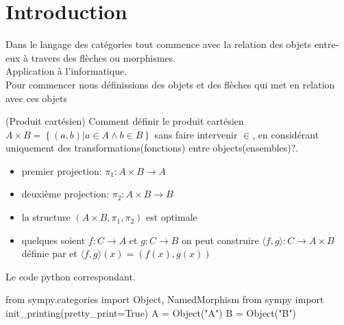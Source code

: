 \section{Introduction}
Dans le langage des catégories tout commence avec la relation des objets entre-eux à travers des flèches ou morphismes.
\\

Application à l'informatique.
\\

Pour commencer nous définissions des objets et des flèches qui met en relation avec ces objets 

\begin{example}(Produit cartésien)
Comment définir le produit cartésien $A \times B = \left\lbrace \left( a, b\right)  \vert a \in A \wedge b \in B\right\rbrace$ sans faire intervenir $\in$, en considérant uniquement des transformations(fonctions) entre objects(ensembles)?.
\begin{itemize}
 \item premier projection: $\pi_{1}: A \times B \rightarrow A$
 \item deuxième projection: $\pi_{2}: A \times B \rightarrow B$
 \item la structure $\left(A \times B,\pi_{1},\pi_{2}\right) $ est optimale
 \item quelques soient $f: C \rightarrow A$ et $g: C \rightarrow B$ on peut construire 
 $\langle f, g \rangle: C \rightarrow A \times B$ définie par et $\langle f, g \rangle\left(x\right)=\left(f\left(x\right),g\left(x\right)\right)$
 \\
 
\end{itemize}
Le code python correspondant.
\begin{python}
from sympy.categories import Object, NamedMorphism
from sympy import init_printing(pretty_print=True)
A = Object("A")
B = Object("B")
\end{python}
\end{example}
